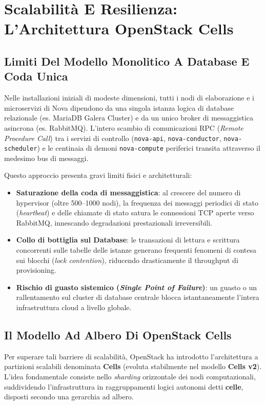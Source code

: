 \documentclass[11pt, a4paper]{article}
\begin{document}
\section{Scalabilità E Resilienza: L'Architettura OpenStack Cells}

\subsection{Limiti Del Modello Monolitico A Database E Coda Unica}

Nelle installazioni iniziali di modeste dimensioni, tutti i nodi di elaborazione e i microservizi di Nova dipendono da una singola istanza logica di database relazionale (es. MariaDB Galera Cluster) e da un unico broker di messaggistica asincrona (es. RabbitMQ). L'intero scambio di comunicazioni RPC (\emph{Remote Procedure Call}) tra i servizi di controllo (\texttt{nova-api}, \texttt{nova-conductor}, \texttt{nova-scheduler}) e le centinaia di demoni \texttt{nova-compute} periferici transita attraverso il medesimo bus di messaggi.

Questo approccio presenta gravi limiti fisici e architetturali:
\begin{itemize}[leftmargin=*]
    \item \textbf{Saturazione della coda di messaggistica}: al crescere del numero di hypervisor (oltre 500--1000 nodi), la frequenza dei messaggi periodici di stato (\emph{heartbeat}) e delle chiamate di stato satura le connessioni TCP aperte verso RabbitMQ, innescando degradazioni prestazionali irreversibili.
    \item \textbf{Collo di bottiglia sul Database}: le transazioni di lettura e scrittura concorrenti sulle tabelle delle istanze generano frequenti fenomeni di contesa sui blocchi (\emph{lock contention}), riducendo drasticamente il throughput di provisioning.
    \item \textbf{Rischio di guasto sistemico (\emph{Single Point of Failure})}: un guasto o un rallentamento sul cluster di database centrale blocca istantaneamente l'intera infrastruttura cloud a livello globale.
\end{itemize}

\subsection{Il Modello Ad Albero Di OpenStack Cells}

Per superare tali barriere di scalabilità, OpenStack ha introdotto l'architettura a partizioni scalabili denominata \textbf{Cells} (evoluta stabilmente nel modello \textbf{Cells v2}). L'idea fondamentale consiste nello \emph{sharding} orizzontale dei nodi computazionali, suddividendo l'infrastruttura in raggruppamenti logici autonomi detti \textbf{celle}, disposti secondo una gerarchia ad albero.
\end{document}
